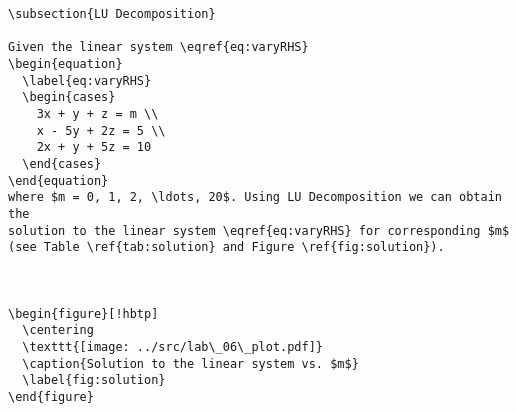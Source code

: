 \begin{verbatim}
\subsection{LU Decomposition}

Given the linear system \eqref{eq:varyRHS}
\begin{equation}
  \label{eq:varyRHS}
  \begin{cases}
    3x + y + z = m \\
    x - 5y + 2z = 5 \\
    2x + y + 5z = 10
  \end{cases}
\end{equation}
where $m = 0, 1, 2, \ldots, 20$. Using LU Decomposition we can obtain the
solution to the linear system \eqref{eq:varyRHS} for corresponding $m$
(see Table \ref{tab:solution} and Figure \ref{fig:solution}).



\begin{figure}[!hbtp]
  \centering
  \texttt{[image: ../src/lab\_06\_plot.pdf]}
  \caption{Solution to the linear system vs. $m$}
  \label{fig:solution}
\end{figure}
\end{verbatim}
